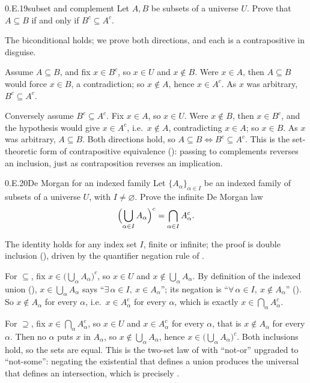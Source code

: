 \documentclass[main.tex]{subfiles}
\begin{document}
\begin{Exercise}{0.E.19}{subset and complement}
Let $A,B$ be subsets of a universe $U$. Prove that $A\subseteq B$ if and only if $B^{c}\subseteq
A^{c}$.
\end{Exercise}
\begin{Solution}
The biconditional holds; we prove both directions, and each is a contrapositive in disguise.

Assume $A\subseteq B$, and fix $x\in B^{c}$, so $x\in U$ and $x\notin B$. Were $x\in A$, then
$A\subseteq B$ would force $x\in B$, a contradiction; so $x\notin A$, hence $x\in A^{c}$. As $x$ was
arbitrary, $B^{c}\subseteq A^{c}$.

Conversely assume $B^{c}\subseteq A^{c}$. Fix $x\in A$, so $x\in U$. Were $x\notin B$, then $x\in
B^{c}$, and the hypothesis would give $x\in A^{c}$, i.e.\ $x\notin A$, contradicting $x\in A$; so
$x\in B$. As $x$ was arbitrary, $A\subseteq B$. Both directions hold, so $A\subseteq B\iff
B^{c}\subseteq A^{c}$. This is the set-theoretic form of contrapositive equivalence
(): passing to complements reverses an inclusion, just as contraposition reverses an
implication.
\end{Solution}

\begin{Exercise}{0.E.20}{De Morgan for an indexed family}
Let $\{A_{\alpha}\}_{\alpha\in I}$ be an indexed family of subsets of a universe $U$, with $I\neq
\varnothing$. Prove the infinite De Morgan law
\[
\Bigl(\bigcup_{\alpha\in I}A_{\alpha}\Bigr)^{c}=\bigcap_{\alpha\in I}A_{\alpha}^{c}.
\]
\end{Exercise}
\begin{Solution}
The identity holds for any index set $I$, finite or infinite; the proof is double inclusion
(), driven by the quantifier negation rule of .

For $\subseteq$, fix $x\in\bigl(\bigcup_{\alpha}A_{\alpha}\bigr)^{c}$, so $x\in U$ and $x\notin
\bigcup_{\alpha}A_{\alpha}$. By definition of the indexed union (), $x\in
\bigcup_{\alpha}A_{\alpha}$ says ``$\exists\,\alpha\in I,\ x\in A_{\alpha}$''; its negation is
``$\forall\,\alpha\in I,\ x\notin A_{\alpha}$'' (). So $x\notin A_{\alpha}$ for every
$\alpha$, i.e.\ $x\in A_{\alpha}^{c}$ for every $\alpha$, which is exactly $x\in
\bigcap_{\alpha}A_{\alpha}^{c}$.

For $\supseteq$, fix $x\in\bigcap_{\alpha}A_{\alpha}^{c}$, so $x\in U$ and $x\in A_{\alpha}^{c}$ for
every $\alpha$, that is $x\notin A_{\alpha}$ for every $\alpha$. Then no $\alpha$ puts $x$ in
$A_{\alpha}$, so $x\notin\bigcup_{\alpha}A_{\alpha}$, hence $x\in\bigl(\bigcup_{\alpha}
A_{\alpha}\bigr)^{c}$. Both inclusions hold, so the sets are equal. This is the two-set law of
 with ``not-or'' upgraded to ``not-some'': negating the existential that defines a union
produces the universal that defines an intersection, which is precisely .
\end{Solution}
\par\bigskip{}\par\nobreak\smallskip
\end{document}
